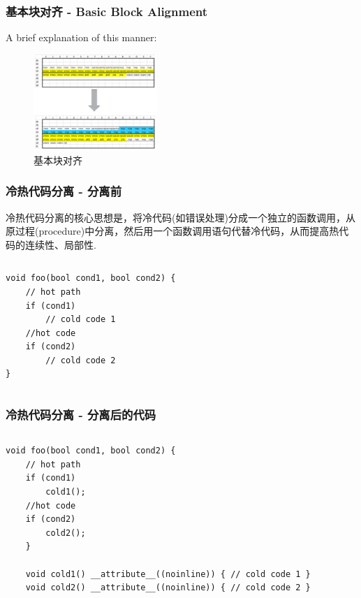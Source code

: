 \begin{frame}
    \frametitle{基本块对齐 - Basic Block Alignment}
    \centering

    A brief explanation of this manner:

    \begin{figure}
        \centering
        \includegraphics[width=0.418\textwidth]{images/alignment.png}
        \caption{基本块对齐}
    \end{figure}

\end{frame}
\begin{frame}[fragile]
    \frametitle{冷热代码分离 - 分离前}
    冷热代码分离的核心思想是，将冷代码(如错误处理)分成一个独立的函数调用，从原过程(procedure)中分离，然后用一个函数调用语句代替冷代码，从而提高热代码的连续性、局部性.
    \begin{columns}
        \begin{column}{0.7\textwidth}
            \begin{lstlisting}
void foo(bool cond1, bool cond2) {
    // hot path
    if (cond1)
        // cold code 1
    //hot code
    if (cond2)
        // cold code 2
}
            \end{lstlisting}
        \end{column}
    \end{columns}
\end{frame}


\begin{frame}[fragile]
    \frametitle{冷热代码分离 - 分离后的代码}
    \begin{columns}
        \begin{column}{1.0\textwidth}
            \begin{lstlisting}
void foo(bool cond1, bool cond2) {
    // hot path
    if (cond1)
        cold1(); 
    //hot code
    if (cond2)
        cold2(); 
    }
    
    void cold1() __attribute__((noinline)) { // cold code 1 }
    void cold2() __attribute__((noinline)) { // cold code 2 }
            \end{lstlisting}
        \end{column}
    \end{columns}
\end{frame}

